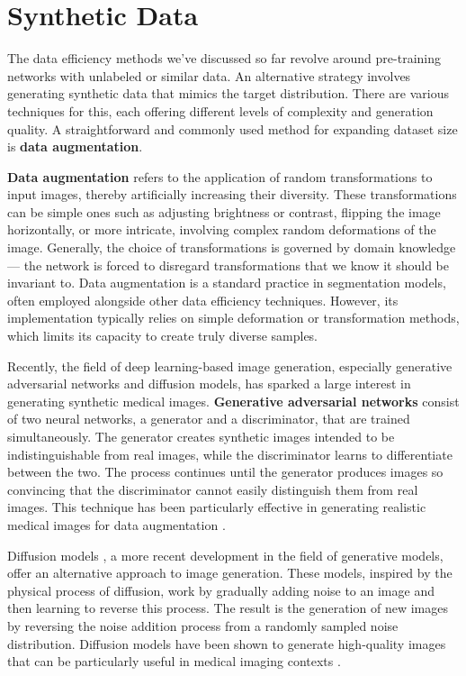 \section{Synthetic Data}

The data efficiency methods we've discussed so far revolve around pre-training networks with unlabeled or similar data. An alternative strategy involves generating synthetic data that mimics the target distribution. There are various techniques for this, each offering different levels of complexity and generation quality. A straightforward and commonly used method for expanding dataset size is \textbf{data augmentation}.

\textbf{Data augmentation} refers to the application of random transformations to input images, thereby artificially increasing their diversity. These transformations can be simple ones such as adjusting brightness or contrast, flipping the image horizontally, or more intricate, involving complex random deformations of the image. Generally, the choice of transformations is governed by domain knowledge --- the network is forced to disregard transformations that we know it should be invariant to. Data augmentation is a standard practice in segmentation models, often employed alongside other data efficiency techniques. However, its implementation typically relies on simple deformation or transformation methods, which limits its capacity to create truly diverse samples.

Recently, the field of deep learning-based image generation, especially generative adversarial networks and diffusion models, has sparked a large interest in generating synthetic medical images. \textbf{Generative adversarial networks} \cite{goodfellowGenerativeAdversarialNetworks2014} consist of two neural networks, a generator and a discriminator, that are trained simultaneously. The generator creates synthetic images intended to be indistinguishable from real images, while the discriminator learns to differentiate between the two. The process continues until the generator produces images so convincing that the discriminator cannot easily distinguish them from real images. This technique has been particularly effective in generating realistic medical images for data augmentation \cite{shinMedicalImageSynthesis2018}.

Diffusion models \cite{ho2020denoising}, a more recent development in the field of generative models, offer an alternative approach to image generation. These models, inspired by the physical process of diffusion, work by gradually adding noise to an image and then learning to reverse this process. The result is the generation of new images by reversing the noise addition process from a randomly sampled noise distribution. Diffusion models have been shown to generate high-quality images that can be particularly useful in medical imaging contexts \cite{khaderDenoisingDiffusionProbabilistic2023}.


